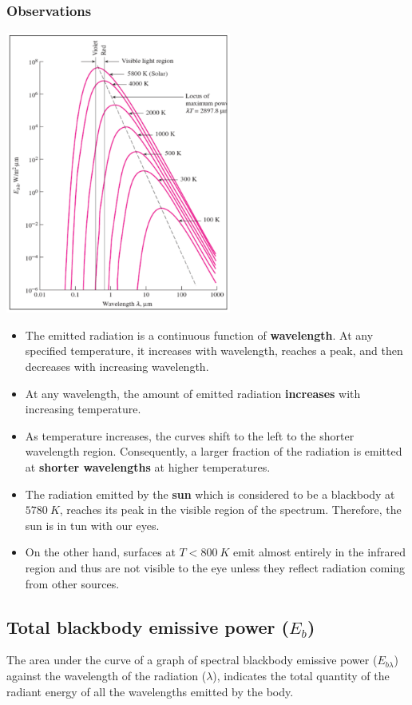 \documentclass[11pt]{article}
\begin{document}
\subsubsection{Observations}
\label{sec:orgdffde9f}
\begin{center}
\includegraphics[height=25em]{./images/wiens-displacement-law-diagram.png}
\end{center}
\begin{itemize}
\item The emitted radiation is a continuous function of \textbf{wavelength}. At any specified temperature, it increases with wavelength, reaches a peak, and then decreases with increasing wavelength.
\item At any wavelength, the amount of emitted radiation \textbf{increases} with increasing temperature.
\item As temperature increases, the curves shift to the left to the shorter wavelength region. Consequently, a larger fraction of the radiation is emitted at \textbf{shorter wavelengths} at higher temperatures.
\item The radiation emitted by the \textbf{sun} which is considered to be a blackbody at \(\qty{5780}{K}\), reaches its peak in the visible region of the spectrum. Therefore, the sun is in tun with our eyes.
\item On the other hand, surfaces at \(T < \qty{800}{K}\) emit almost entirely in the infrared region and thus are not visible to the eye unless they reflect radiation coming from other sources.
\end{itemize}

\subsection{Total blackbody emissive power (\(E_b\))}
\label{sec:org9894039}
The area under the curve of a graph of spectral blackbody emissive power (\(E_{b \lambda}\)) against the wavelength of the radiation (\(\lambda\)), indicates the total quantity of the radiant energy of all the wavelengths emitted by the body.
\end{document}
